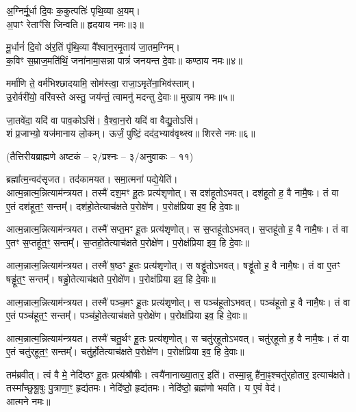 अ॒ग्निर्मू॒र्धा दि॒वः क॒कुत्पतिः॑ पृथि॒व्या अ॒यम्।\\
 अ॒पाꣳ रेताꣳ॑सि जिन्वति॥ हृदयाय नमः॥३॥

मू॒र्धानं॑ दि॒वो अ॑र॒तिं पृ॑थि॒व्या वै᳚श्वान॒रमृ॒ताय॑ जा॒तम॒ग्निम्।\\
क॒विꣳ स॒म्राज॒मति॑थिं॒ जना॑नामा॒सन्ना पात्रं॑ जनयन्त दे॒वाः॥ कण्ठाय नमः॥४॥

मर्मा॑णि ते॒ वर्म॑भिश्छादयामि॒ सोम॑स्त्वा॒ राजा॒ऽमृते॑ना॒भि\-व॑स्ताम्।\\
उ॒रोर्वरी॑यो॒ वरि॑वस्ते अस्तु॒ जय॑न्तं॒ त्वामनु॑ मदन्तु दे॒वाः॥ मुखाय नमः॥५॥

जा॒तवे॑दा॒ यदि॑ वा पाव॒कोऽसि॑। वै॒श्वा॒न॒रो यदि॑ वा वैद्यु॒तोऽसि॑।\\
शं प्र॒जाभ्यो॒ यज॑मानाय लो॒कम्। ऊर्जं॒ पुष्टिं॒ दद॑द॒भ्याव॑वृथ्स्व॥ शिरसे नमः॥६॥

{\small \closesection}

\centerline{\normalsize (तैत्तिरीयब्राह्मणे अष्टकं – २/प्रश्नः – ३/अनुवाकः – ११)}

ब्रह्मा᳚त्म॒न्वद॑सृजत। तद॑कामयत। समा॒त्मना॑ पद्ये॒येति॑।\\
आत्म॒न्नात्म॒न्नित्याम॑न्त्रयत। तस्मै॑ दश॒मꣳ हू॒तः प्रत्य॑शृणोत्। स दश॑हूतोऽभवत्। दश॑हूतो ह॒ वै नामै॒षः। तं वा ए॒तं दश॑हूत॒ꣳ॒ सन्तम्᳚। दश॑हो॒तेत्याच॑क्षते प॒रोक्षे॑ण। प॒रोक्ष॑प्रिया इव॒ हि दे॒वाः॥

आत्म॒न्नात्म॒न्नित्याम॑न्त्रयत। तस्मै॑ सप्त॒मꣳ हू॒तः प्रत्य॑शृणोत्। स स॒प्तहू॑तोऽभवत्। स॒प्तहू॑तो ह॒ वै नामै॒षः। तं वा ए॒तꣳ स॒प्तहू॑त॒ꣳ॒ सन्तम्᳚। स॒प्तहो॒तेत्याच॑क्षते प॒रोक्षे॑ण। प॒रोक्ष॑प्रिया इव॒ हि दे॒वाः॥

आत्म॒न्नात्म॒न्नित्याम॑न्त्रयत। तस्मै॑ ष॒ष्ठꣳ हू॒तः प्रत्य॑शृणोत्। स षड्ढू॑तोऽभवत्। षड्ढू॑तो ह॒ वै नामै॒षः। तं वा ए॒तꣳ षड्ढू॑त॒ꣳ॒ सन्तम्᳚। षड्ढो॒तेत्याच॑क्षते प॒रोक्षे॑ण। प॒रोक्ष॑प्रिया इव॒ हि दे॒वाः॥

आत्म॒न्नात्म॒न्नित्याम॑न्त्रयत। तस्मै॑ पञ्च॒मꣳ हू॒तः प्रत्य॑शृणोत्। स पञ्च॑हूतोऽभवत्। पञ्च॑हूतो ह॒ वै नामै॒षः। तं वा ए॒तं पञ्च॑हूत॒ꣳ॒ सन्तम्᳚। पञ्च॑हो॒तेत्याच॑क्षते प॒रोक्षे॑ण। प॒रोक्ष॑प्रिया इव॒ हि दे॒वाः॥

आत्म॒न्नात्म॒न्नित्याम॑न्त्रयत। तस्मै॑ चतु॒र्थꣳ हू॒तः प्रत्य॑शृणोत्। स चतु॑र्‌हूतोऽभवत्। चतु॑र्‌हूतो ह॒ वै नामै॒षः। तं वा ए॒तं चतु॑र्‌हूत॒ꣳ॒ सन्तम्᳚। चतु॑र्हो॒तेत्याच॑क्षते प॒रोक्षे॑ण। प॒रोक्ष॑प्रिया इव॒ हि दे॒वाः॥

तम॑ब्रवीत्। त्वं वै मे॒ नेदि॑ष्ठꣳ हू॒तः प्रत्य॑श्रौषीः। त्वयै॑नानाख्या॒तार॒ इति॑। तस्मा॒न्नु है॑ना॒ꣴ॒श्चतु॑र्‌होतार॒ इत्याच॑क्षते। तस्मा᳚च्छुश्रू॒षुः पु॒त्राणा॒ꣳ॒ हृद्य॑तमः। नेदि॑ष्ठो॒ हृद्य॑तमः। नेदि॑ष्ठो॒ ब्रह्म॑णो भवति। य ए॒वं वेद॑।\\
आत्मने नमः॥

